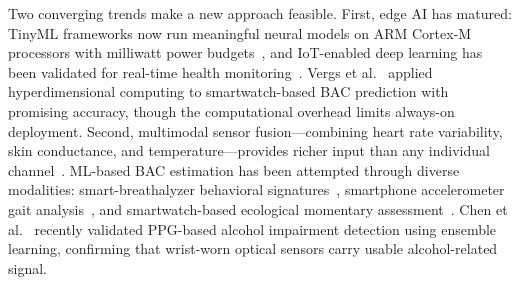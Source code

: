 \documentclass[HARVARD,Times2COL]{WileyNJDv5} %
\providecommand{\DIFadd}[1]{{\protect\color{red} #1}} %
\providecommand{\DIFdel}[1]{} %
\providecommand{\DIFaddbegin}{} %
\providecommand{\DIFaddend}{} %
\providecommand{\DIFdelbegin}{} %
\providecommand{\DIFdelend}{} %
\providecommand{\DIFscaledelfig}{0.5}
\newlength{\DIFdelgraphicswidth} %
\newlength{\DIFdelgraphicsheight} %
\providecommand{\DIFaddincludegraphics}[2][]{{\color{blue}\fbox{\DIFOincludegraphics[#1]{#2}}}} %
\providecommand{\DIFdelincludegraphics}[2][]{%
\sbox{\DIFdelgraphicsbox}{\DIFOincludegraphics[#1]{#2}}%
\settoboxwidth{\DIFdelgraphicswidth}{\DIFdelgraphicsbox} %
\settoboxtotalheight{\DIFdelgraphicsheight}{\DIFdelgraphicsbox} %
\scalebox{\DIFscaledelfig}{%
\parbox[b]{\DIFdelgraphicswidth}{\usebox{\DIFdelgraphicsbox}\\[-\baselineskip] \rule{\DIFdelgraphicswidth}{0em}}\llap{\resizebox{\DIFdelgraphicswidth}{\DIFdelgraphicsheight}{%
\setlength{\unitlength}{\DIFdelgraphicswidth}%
\begin{picture}(1,1)%
\thicklines\linethickness{2pt} %
{\color[rgb]{1,0,0}\put(0,0){\framebox(1,1){}}}%
{\color[rgb]{1,0,0}\put(0,0){\line( 1,1){1}}}%
{\color[rgb]{1,0,0}\put(0,1){\line(1,-1){1}}}%
\end{picture}%
}\hspace*{3pt}}} %
} %
\DeclareRobustCommand{\DIFaddbegin}{\DIFOaddbegin \let\includegraphics\DIFaddincludegraphics} %
\DeclareRobustCommand{\DIFaddend}{\DIFOaddend \let\includegraphics\DIFOincludegraphics} %
\DeclareRobustCommand{\DIFdelbegin}{\DIFOdelbegin \let\includegraphics\DIFdelincludegraphics} %
\DeclareRobustCommand{\DIFdelend}{\DIFOaddend \let\includegraphics\DIFOincludegraphics} %
\begin{document}
\DIFdelbegin %
\DIFdelend \DIFaddbegin \DIFadd{Two converging trends make a new approach feasible. First, edge AI has matured: TinyML frameworks now run meaningful neural models on ARM Cortex-M processors with milliwatt power budgets~\citep{zhou2025tinyml, abadade2023}, and IoT-enabled deep learning has been validated for real-time health monitoring~\citep{wu2023internet}. }\DIFaddend Vergs et al.~\citep{verges2024} \DIFdelbegin %
\DIFdelend \DIFaddbegin \DIFadd{applied hyperdimensional computing to smartwatch-based BAC prediction with promising accuracy, though the computational overhead limits always-on deployment. Second, }\DIFaddend multimodal sensor fusion---combining heart rate variability, skin conductance, and \DIFdelbegin \DIFdel{temperature}%
\DIFdelend \DIFaddbegin \DIFadd{temperature---provides richer input than any individual channel}\DIFaddend ~\citep{sensors2024, sensors2023, vedanarayanan2024}. \DIFdelbegin %
\DIFdel{~\citep{alcowatch2025}. }%
\DIFdelend \DIFaddbegin \DIFadd{ML-based BAC estimation has been attempted through diverse modalities: smart-breathalyzer behavioral signatures~\citep{gharani2021}, smartphone accelerometer gait analysis~\citep{killian2019}, and smartwatch-based ecological momentary assessment~\citep{alcowatch2025}. Chen et al.~\citep{chen2025} recently validated PPG-based alcohol impairment detection using ensemble learning, confirming that wrist-worn optical sensors carry usable alcohol-related signal.
}\DIFaddend 
\end{document}
